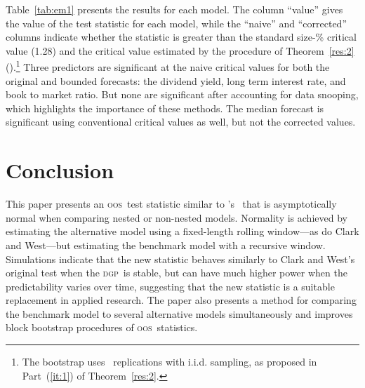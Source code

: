 \documentclass[11pt,fleqn]{article}
\newcommand\poscw{\citeauthor{ClW:06}'s \citeyearpar{ClW:06,ClW:07}}
\theoremstyle{definition}
\newcommand{\dgp}{\textsc{dgp}}
\newcommand{\oos}{\textsc{oos}}
\begin{document}
Table~\ref{tab:em1} presents the results for each model.  The column
``value'' gives the value of the test statistic for each model, while
the ``naive'' and ``corrected'' columns indicate whether the statistic
is greater than the standard size-\bootsize\% critical value (1.28)
and the critical value estimated by the procedure of
Theorem~\ref{res:2} (\empiricalcriticalvalue).\footnote{The bootstrap
  uses \nboot\ replications with i.i.d. sampling, as proposed in
  Part~(\ref{it:1}) of Theorem~\ref{res:2}.}  Three predictors are
significant at the naive critical values for both the original and
bounded forecasts: the dividend yield, long term interest rate, and
book to market ratio.  But none are significant after accounting for
data snooping, which highlights the importance of these methods.  The
median forecast is significant using conventional critical values as
well, but not the corrected values.

\begin{table}[tb!]
  \centering
  \empiricaltable
\caption{Results from \oos\ comparison of equity premium prediction
  models; the benchmark is the recursive sample mean of the equity
  premium and each alternative model is a constant and single lag of
  the variable listed in the ``predictor'' column.  The dataset begins
  in 1927 and ends in 2009 and is annual data. The ``value'' column
  lists the value of this paper's \oos\ statistic, the ``naive''
  column indicates whether the statistic is significant at standard
  critical values, and the ``corrected'' column indicates significance
  using the critical values proposed in Theorem~\ref{res:2} that
  account for the number of models.  See Section~\ref{sec:3} for details.}
\label{tab:em1}
\end{table}


\section{Conclusion}\label{sec:4}
This paper presents an \oos\ test statistic similar to \poscw\ that is
asymptotically normal when comparing nested or non-nested models.
Normality is achieved by estimating the alternative model using a
fixed-length rolling window---as do Clark and West---but estimating
the benchmark model with a recursive window.  Simulations indicate
that the new statistic behaves similarly to Clark and West's original
test when the \dgp\ is stable, but can have much higher power when the
predictability varies over time, suggesting that the new statistic is
a suitable replacement in applied research.  The paper also presents a
method for comparing the benchmark model to several alternative models
simultaneously and improves block bootstrap procedures of \oos\
statistics.
\end{document}
